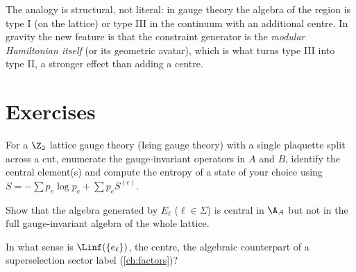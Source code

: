 \begin{whatwrong}
The analogy is structural, not literal: in gauge theory the algebra of the region is type I (on the lattice) or type III in the continuum with an additional centre. In gravity the new feature is that the constraint generator is the \emph{modular Hamiltonian itself} (or its geometric avatar), which is what turns type III into type II, a stronger effect than adding a centre.
\end{whatwrong}

\section*{Exercises}
\begin{exercise}
For a $\Z_2$ lattice gauge theory (Ising gauge theory) with a single plaquette split across a cut, enumerate the gauge-invariant operators in $A$ and $B$, identify the central element(s) and compute the entropy of a state of your choice using $S=-\sum p_e\log p_e+\sum p_eS^{(e)}$.
\end{exercise}
\begin{exercise}
Show that the algebra generated by $E_\ell$ ($\ell\in\Sigma$) is central in $\A_A$ but not in the full gauge-invariant algebra of the whole lattice.
\end{exercise}
\begin{exercise}
In what sense is $\Linf(\{e_\ell\})$, the centre, the algebraic counterpart of a superselection sector label (\cref{ch:factors})?
\end{exercise}
